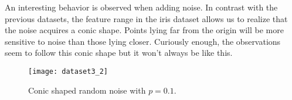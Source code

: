 An interesting behavior is observed when adding noise. In contrast with the previous datasets, the feature range in the iris dataset allows us to realize that the noise acquires a conic shape. Points lying far from the origin will be more sensitive to noise than those lying closer. Curiously enough, the observations seem to follow this conic shape but it won't always be like this.
\begin{figure}[h]
	\centering
	\captionsetup{justification=centering}
	\texttt{[image: dataset3\_2]}
	\caption{Conic shaped random noise with $p = 0.1$.}
	\label{dataset3_2}
\end{figure}
